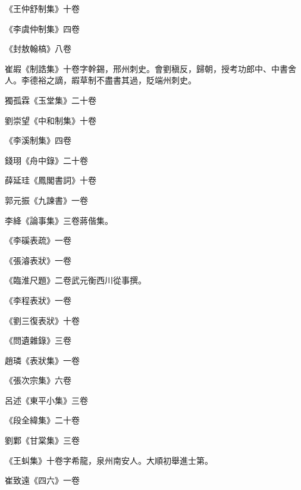 \begin{pinyinscope}
 《王仲舒制集》十卷



 《李虞仲制集》四卷



 《封敖翰槁》八卷



 崔嘏《制誥集》十卷字幹錫，邢州刺史。會劉稹反，歸朝，授考功郎中、中書舍人。李德裕之謫，嘏草制不盡書其過，貶端州刺史。



 獨孤霖《玉堂集》二十卷



 劉崇望《中和制集》十卷



 《李溪制集》四卷



 錢珝《舟中錄》二十卷



 薛延珪《鳳閣書詞》十卷



 郭元振《九諫書》一卷



 李絳《論事集》三卷蔣偕集。



 《李磎表疏》一卷



 《張濬表狀》一卷



 《臨淮尺題》二卷武元衡西川從事撰。



 《李程表狀》一卷



 《劉三復表狀》十卷



 《問遺雜錄》三卷



 趙璘《表狀集》一卷



 《張次宗集》六卷



 呂述《東平小集》三卷



 《段全緯集》二十卷



 劉鄴《甘棠集》三卷



 《王虯集》十卷字希龍，泉州南安人。大順初舉進士第。



 崔致遠《四六》一卷




\end{pinyinscope}
